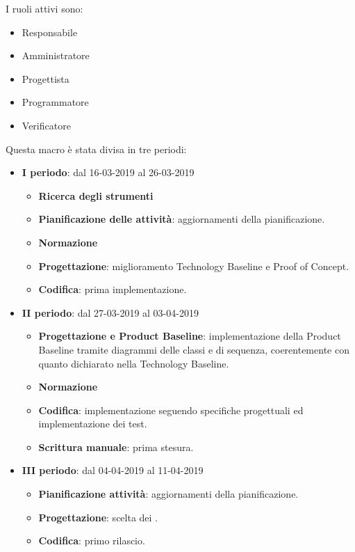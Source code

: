         I ruoli attivi sono: 
        \begin{itemize}
            \item Responsabile
            \item Amministratore
            \item Progettista
            \item Programmatore
            \item Verificatore
        \end{itemize}
        Questa macro è stata divisa in tre periodi:
		\begin{itemize}
			\item \textbf{I periodo}: dal 16-03-2019 al 26-03-2019
			\begin{itemize}
    	        \item \textbf{Ricerca degli strumenti}
    	        \item \textbf{Pianificazione delle attività}: aggiornamenti della pianificazione.
    	        \item \textbf{Normazione}
    	        \item \textbf{Progettazione}: miglioramento Technology Baseline e Proof of Concept.
    	        \item \textbf{Codifica}: prima implementazione.
        	\end{itemize}
			\item \textbf{II periodo}: dal 27-03-2019 al 03-04-2019
			\begin{itemize}
				\item \textbf{Progettazione e Product Baseline}: implementazione della Product Baseline tramite diagrammi delle classi e di sequenza,
				coerentemente con quanto dichiarato nella Technology Baseline.
    	        \item \textbf{Normazione}
    	        \item \textbf{Codifica}: implementazione seguendo specifiche progettuali ed implementazione dei test.
    	        \item \textbf{Scrittura manuale}: prima stesura.
        	\end{itemize}
        	\item \textbf{III periodo}: dal 04-04-2019 al 11-04-2019
			\begin{itemize}
				\item \textbf{Pianificazione attività}: aggiornamenti della pianificazione.
    	        \item \textbf{Progettazione}: scelta dei .
    	        \item \textbf{Codifica}: primo rilascio.

\end{itemize}
\end{itemize}
